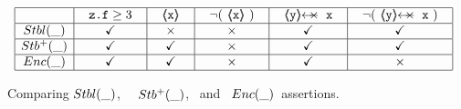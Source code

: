 \begin{figure}[hbt] 
 $
 \begin{array}{c}
 \begin{array}{|c|c|c|c|c|c|}
 \hline
          & \ \ \prg{z.f}\geq 3  \ \ &  \ \   \inside{\prg{x}} \ \ & \ \ \neg(\ \inside{\prg{x}}\ ) \ \ & \ \ \protectedFrom {\prg{y}} {\prg{x}} \ \ &  \ \ \neg (\ \protectedFrom {\prg{y}} {\prg{x}}\ ) \ \ \\
   \hline
 \Stable  {\_}  &  \checkmark &  \times & \times &  \checkmark  &  \checkmark  \\
 \hline 
  \Pos {\_ } &  \checkmark &   \checkmark  & \times &  \checkmark  &  \checkmark  \\ 
  \hline 
  \encaps{\_ } &   \checkmark &  \checkmark & \times &  \checkmark  &  \times \\ 
  \hline
 \end{array}
  \end{array}
 $
 \caption{Comparing ${Stbl( \_ )}$, \ \ ${Stb^+( \_ )}$, \ and \ ${Enc( \_ )}$\ assertions.}
 \label{f:Compare:stable:enc}
\end{figure}

